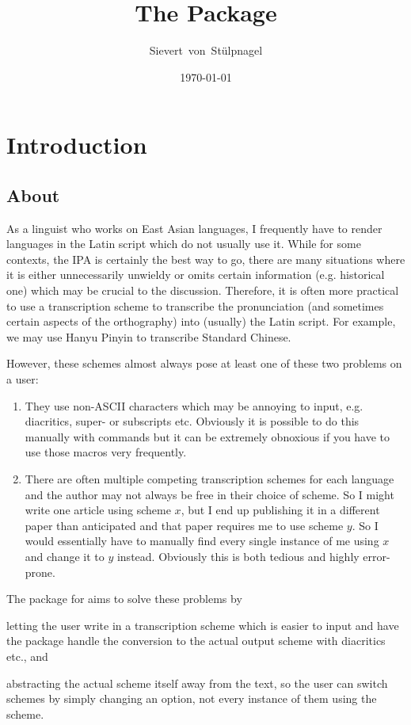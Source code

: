 \documentclass{ltxdockit}
\title{The \transconv{} Package}
\author{Sievert\ von\ St\"{u}lpnagel}
\date{\today}
\begin{document}
\maketitle

\tableofcontents
\listoftables

\section{Introduction}
\label{int}

\subsection[About]{About \transconv{}}

As a linguist who works on East Asian languages, I frequently have to render
languages in the Latin script which do not usually use it. While for some
contexts, the IPA is certainly the best way to go, there are many situations
where it is either unnecessarily unwieldy or omits certain information (e.g.
historical one) which may be crucial to the discussion. Therefore, it is often
more practical to use a transcription scheme to transcribe the pronunciation
(and sometimes certain aspects of the orthography) into (usually) the Latin
script. For example, we may use Hanyu Pinyin to transcribe Standard Chinese.

However, these schemes almost always pose at least one of these two problems on
a  user:

\begin{enumerate}
  \item They use non-ASCII characters which may be annoying to input, e.g.
    diacritics, super- or subscripts etc. Obviously it is possible to do this
    manually with  commands but it can be extremely obnoxious if you
    have to use those macros very frequently.
  \item There are often multiple competing transcription schemes for each
    language and the author may not always be free in their choice of scheme.
    So I might write one article using scheme \(x\), but I end up publishing it
    in a different paper than anticipated and that paper requires me to use
    scheme \(y\). So I would essentially have to manually find every single
    instance of me using \(x\) and change it to \(y\) instead. Obviously this is
    both tedious and highly error-prone.
\end{enumerate}

The \transconv{} package for  aims to solve these problems by
\begin{enumerate*}[label=\alph*)]
  \item letting the user write in a transcription scheme which is easier to
    input and have the package handle the conversion to the actual output scheme
    with diacritics etc., and
  \item abstracting the actual scheme itself away from the text, so the user can
    switch schemes by simply changing an option, not every instance of them
    using the scheme.
\end{enumerate*}
\end{document}
